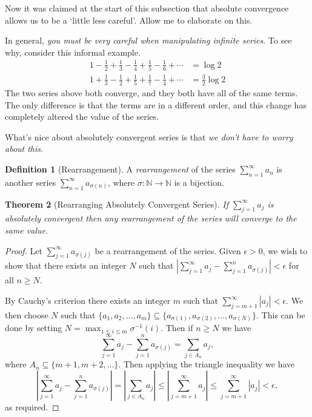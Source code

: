 \documentclass[11pt, a4paper]{article}
\newtheorem{theorem}{Theorem}[section]
\theoremstyle{definition}
\newtheorem{definition}[theorem]{Definition}
\newcommand{\vocab}[1]{\emph{#1}} %
\newcommand{\N}{\mathbb{N}}
\begin{document}
Now it was claimed at the start of this subsection that absolute convergence allows us to be a `little less careful'. Allow me to elaborate on this. 


In general, \emph{\color{red} you must be very careful when manipulating infinite series}. To see why, consider this informal example.
\begin{align*}
	1-\frac{1}{2}+\frac{1}{3}-\frac{1}{4}+\frac{1}{5}-\frac{1}{6}+\cdots &= \log 2 \\
	1+\frac{1}{3}-\frac{1}{2}+\frac{1}{5}+\frac{1}{7}-\frac{1}{4}+\cdots &= \frac{3}{2} \log 2
\end{align*}
The two series above both converge, and they both have all of the same terms. The only difference is that the terms are in a different order, and this change has completely altered the value of the series.

What's nice about absolutely convergent series is that \emph{we don't have to worry about this}.

\begin{definition}[Rearrangement]
	A \vocab{rearrangement} of the series $\sum_{n = 1}^{\infty} a_n$ is another series $\sum_{n = 1}^{\infty} a_{\sigma(n)}$, where $\sigma : \N \rightarrow \N$ is a bijection.
\end{definition}

\begin{theorem}[Rearranging Absolutely Convergent Series]
	If $\sum_{j = 1}^{\infty} a_j$ is absolutely convergent then any rearrangement of the series will converge to the same value.
\end{theorem}
\begin{proof}
Let $\sum_{j = 1}^{\infty} a_{\sigma(j)}$ be a rearrangement of the series. Given $\epsilon > 0$, we wish to show that there exists an integer $N$ such that $|\sum_{j = 1}^{\infty} a_j - \sum_{j = 1}^n a_{\sigma(j)}| < \epsilon$ for all $n \geq N$.

By Cauchy's criterion there exists an integer $m$ such that $\sum_{j = m + 1}^{\infty} |a_j| < \epsilon$.
We then choose $N$ such that $\{a_1, a_2, \dots, a_m\} \subseteq \{a_{\sigma(1)}, a_{\sigma(2)}, \dots, a_{\sigma(N)}\}$. This can be done by setting $N = \max_{1 \leq i \leq m} \sigma^{-1}(i)$.
Then if $n \geq N$ we have
$$
\sum_{j = 1}^{\infty} a_j - \sum_{j = 1}^n a_{\sigma(j)} = \sum_{j \in A_n} a_j,
$$
where $A_n \subseteq \{m + 1, m + 2, \dots \}$. 
Then applying the triangle inequality we have
$$
\left|\sum_{j = 1}^{\infty} a_j - \sum_{j = 1}^n a_{\sigma(j)}\right| = \left|\sum_{j \in A_n} a_j\right| \leq \left|\sum_{j = m + 1}^{\infty} a_j \right| \leq \sum_{j = m + 1}^{\infty} |a_j| < \epsilon,
$$
as required.
\end{proof}
\end{document}
